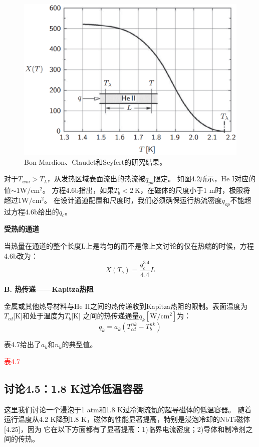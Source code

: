 \begin{figure}[htbp]
	\centering
	\includegraphics[scale=0.5]{chpt4/figs/fig4.9.eps}
	\caption{Bon Mardion、Claudet和Seyfert的研究结果。}
\end{figure}

对于$T_{wm} > T_\lambda$，从发热区域表面流出的热流被$q_{pk}$限定。
如图4.2所示，He I对应的值$\sim 1 \mathrm{W/cm^2}$。
方程4.6b指出，如果$T_b<2\ \mathrm{K}$，在磁体的尺度小于1 m时，极限将超过$1 \mathrm{W/cm^2}$。
在设计通道配置和尺度时，我们必须确保运行热流密度$q_{op}$不能超过方程4.6b给出的$q_c$。

\textbf{受热的通道}

当热量在通道的整个长度L上是均匀的而不是像上文讨论的仅在热端的时候，方程4.6b改为：
\begin{equation*}%
X(T_b)=\frac{q_{c}^{3.4}}{4.4}L \tag{4.6c}
\end{equation*}

\textbf{B. 热传递——Kapitza热阻}

金属或其他热导材料与He II之间的热传递收到Kapitza热阻的限制。表面温度为$T_{cd}$[K]和处于温度为$T_b$[K]
之间的热传递通量$q_k[\mathrm{W/cm^2}]$为：
\begin{equation}%
q_k=a_k(T_{cd}^{nk}-T_{b}^{nk})
\end{equation}

表4.7给出了$a_k$和$n_k$的典型值。

\textcolor{red}{表4.7}



\subsection{讨论4.5：1.8 K过冷低温容器}
这里我们讨论一个浸泡于1 atm和1.8 K过冷潮流氦的超导磁体的低温容器。
随着运行温度从4.2 K降到1.8 K，磁体的性能显著提高，特别是浸泡冷却的NbTi磁体[4.25]，因为
它在以下方面都有了显著提高：1)临界电流密度；2)导体和制冷剂之间的传热。

